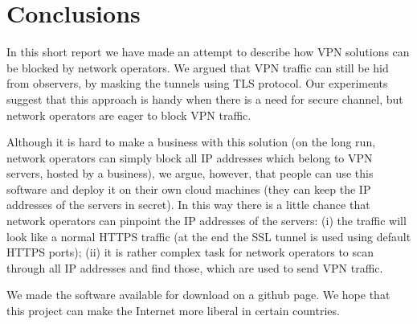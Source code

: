 \section{Conclusions}
\label{section:conclusion}

In this short report we have made an attempt to describe how VPN solutions
can be blocked by network operators. We argued that VPN traffic can still be
hid from observers, by masking the tunnels using TLS protocol. 
Our experiments suggest that this approach is handy when there is a need
for secure channel, but network operators are eager to block VPN traffic.

Although it is hard to make a business with this solution (on the long
run, network operators can simply block all IP addresses which belong to VPN servers,
hosted by a business), we argue, however, that people can use this software
and deploy it on their own cloud machines (they can keep the IP addresses 
of the servers in secret). In this way there is a little chance
that network operators can pinpoint the IP addresses of the servers: (i)
the traffic will look like a normal HTTPS traffic (at the end
the SSL tunnel is used using default HTTPS ports); (ii) it is rather complex task
for network operators to scan through all IP addresses and find those, which 
are used to send VPN traffic.

We made the software available for download on a github page. We hope that 
this project can make the Internet more liberal in certain countries.
